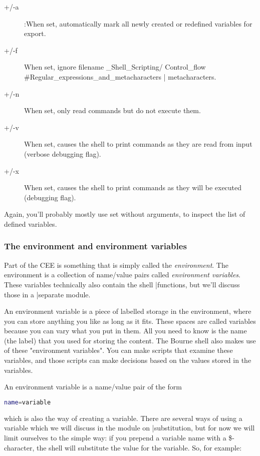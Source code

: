 \begin{description}
\item[+/-a]:When set, automatically mark all newly created or redefined variables for export.
\item[+/-f]When set, ignore filename \_Shell\_Scripting/ Control\_flow \#Regular\_expressions\_and\_metacharacters | metacharacters.
\item[+/-n]When set, only read commands but do not execute them.
\item[+/-v]When set, causes the shell to print commands as they are read from input (verbose debugging flag).
\item[+/-x]When set, causes the shell to print commands as they will be executed (debugging flag).
\end{description}

Again, you'll probably mostly use set without arguments, to inspect the list of
defined variables.

\subsubsection{The environment and environment variables}
Part of the CEE is something that is simply called the \textit{environment}.
The environment is a collection of name/value pairs called \textit{environment variables}.
These variables technically also contain the shell |functions, but
we'll discuss those in a |separate module.

An environment variable is a piece of labelled storage in the environment,
where you can store anything you like as long as it fits. These spaces are
called variables because you can vary what you put in them. All you need to
know is the name (the label) that you used for storing the content. The Bourne
shell also makes use of these "environment variables". You can make scripts
that examine these variables, and those scripts can make decisions based on the
values stored in the variables.

An environment variable is a name/value pair of the form

\lstset{basicstyle=\scriptsize, numbers=left, captionpos=b, tabsize=4}
\begin{lstlisting}[language={bash},
xleftmargin=15pt]
name=variable
\end{lstlisting}

which is also the way of creating a variable. There are several ways of using a
variable which we will discuss in the module on |substitution, but for now we
will limit ourselves to the simple way: if you prepend a variable name with a
\$-character, the shell will substitute the value for the variable. So, for
example:

